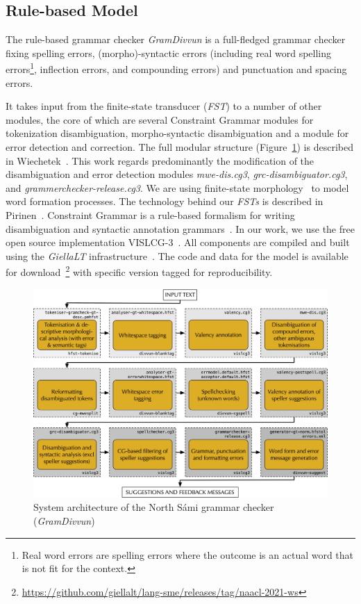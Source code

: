 \documentclass[postprint]{flammie}
\begin{document}
\subsection{Rule-based Model}

The rule-based grammar checker \textit{GramDivvun} is a full-fledged grammar
checker fixing spelling errors, (morpho)-syntactic errors (including real word
spelling errors\footnote{Real word errors are spelling errors where the outcome
is an actual word that is not fit for the context.}, inflection errors, and
compounding errors) and punctuation and spacing errors.


It takes input from the finite-state transducer (\textit{FST}) to a number of
other modules, the core of which are several Constraint Grammar modules for
tokenization disambiguation, morpho-syntactic disambiguation and a module for
error detection and correction. The full modular structure
(Figure~\ref{fig:my_label}) is described in
Wiechetek~\cite{wiechetek2019seeing}.  This work regards  predominantly the
modification of the disambiguation and error detection modules
\textit{mwe-dis.cg3}, \textit{grc-disambiguator.cg3}, and
\textit{grammerchecker-release.cg3}.  We are using finite-state
morphology~\cite{beesley2003finite} to model word formation processes.  The
technology behind our \textit{FSTs} is described in
Pirinen~\cite{pirinen2010finitestate}.  Constraint Grammar is a rule-based
formalism for writing disambiguation and syntactic annotation
grammars~\cite{karlsson1990constraint,karlsson1995constraint}.  In our work, we
use the free open source implementation VISLCG-3~\cite{didriksen2015cg3}. All
components are compiled and built using the \textit{GiellaLT}
infrastructure~\cite{moshagen-etal-2013-building}.  The code and data for the
model is available for
download~\footnote{\url{https://github.com/giellalt/lang-sme/releases/tag/naacl-2021-ws}}
with specific version tagged for reproducibility.


    \begin{figure}[ht]
    \begin{center}
    \includegraphics{GramCheckLightFlow-08-2021.png}
    \caption{System architecture of the North Sámi grammar checker
        (\textit{GramDivvun})\label{fig:my_label}}
    \end{center}
    \end{figure}
\end{document}
